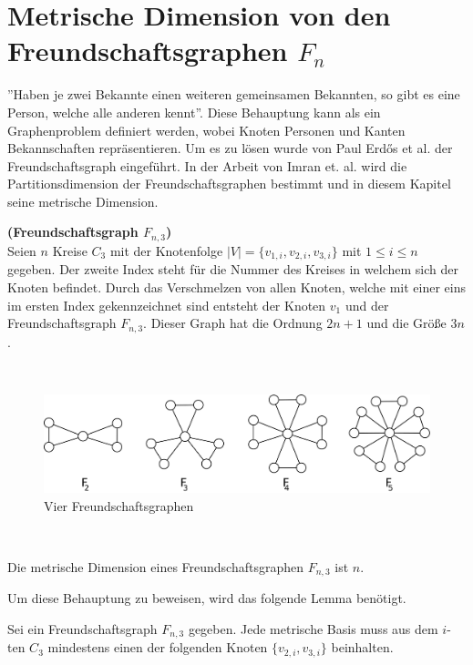 \section{Metrische Dimension von den Freundschaftsgraphen $F_{n}$}
''Haben je zwei Bekannte einen weiteren gemeinsamen Bekannten, so gibt es eine Person, welche alle anderen kennt''. Diese Behauptung kann als ein Graphenproblem definiert werden, wobei Knoten Personen und Kanten Bekannschaften repräsentieren. Um es zu lösen wurde von Paul Erdős et al. \cite{Erdos} der Freundschaftsgraph eingeführt. In der Arbeit von Imran et. al. \cite{Imran} wird die Partitionsdimension der Freundschaftsgraphen bestimmt und in diesem Kapitel seine metrische Dimension.
\begin{defi}{\textbf{(Freundschaftsgraph $F_{n,3}$)}}\\
Seien $n$ Kreise $C_{3}$ mit der Knotenfolge $|V|=\{v_{1,i},v_{2,i},v_{3,i}\}$  mit $1 \leq i \leq n$ gegeben. Der zweite Index steht für die Nummer des Kreises in welchem sich der Knoten befindet. Durch das Verschmelzen von allen Knoten, welche mit einer eins im ersten Index gekennzeichnet sind entsteht der Knoten $v_1$ und der Freundschaftsgraph $F_{n,3}$. Dieser Graph hat die Ordnung $2n+1$ und die Größe $3n$.
\end{defi}
\begin{bsp}~
\begin{figure}[h!]
\centering
 		 \includegraphics[width=400pt]{bilder/freunschaftsgraph.pdf}
   \caption{Vier Freundschaftsgraphen}
   \label{bild:fg}
\end{figure}
\end{bsp}
~\linebreak
\begin{lem}
\label{Freundschaftsgraphen}
Die metrische Dimension eines Freundschaftsgraphen $F_{n,3}$ ist $n$.
\end{lem}
Um diese Behauptung zu beweisen, wird das folgende Lemma benötigt. 
\begin{lem}
\label{mindfreundschaftsgraph}
Sei ein Freundschaftsgraph $F_{n,3}$ gegeben. Jede metrische Basis muss aus dem $i$-ten $C_3$ mindestens einen der folgenden Knoten $\{v_{2,i},v_{3,i}\}$ beinhalten. 
\end{lem}

